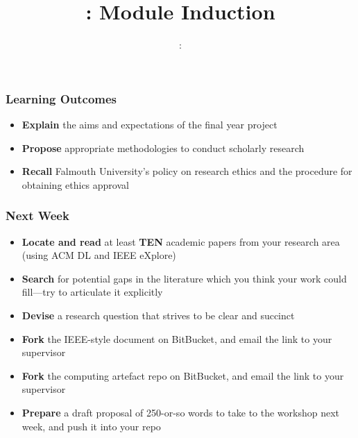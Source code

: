 \usepackage{../../beamerthemeFalmouthGamesAcademy}
\usepackage{multimedia}
\graphicspath{ {../../} }


\usepackage[normalem]{ulem}
\usepackage{wasysym}

\usepackage{algpseudocode}

\usepackage{pdfpages}

\usepackage{fancyvrb}

\usetikzlibrary{arrows,automata}





\title{\sessionnumber: Module Induction}
\subtitle{\modulecode: \moduletitle}

\frame{\titlepage} 

\begin{frame}
	\frametitle{Learning Outcomes}
	\begin{itemize}
		\item \textbf{Explain} the aims and expectations of the final year project
		\item \textbf{Propose} appropriate methodologies to conduct scholarly research
		\item \textbf{Recall} Falmouth University's policy on research ethics and the procedure for obtaining ethics approval
	\end{itemize}
\end{frame}





\begin{frame}
	\frametitle{Next Week}
	\begin{itemize}
		\item \textbf{Locate and read} at least \textbf{TEN} academic papers from your research area (using ACM DL and IEEE eXplore)
		\item \textbf{Search} for potential gaps in the literature which you think your work could fill---try to articulate it explicitly
		\item \textbf{Devise} a research question that strives to be clear and succinct
		\item \textbf{Fork} the IEEE-style document on BitBucket, and email the link to your supervisor
		\item \textbf{Fork} the computing artefact repo on BitBucket, and email the link to your supervisor
		\item \textbf{Prepare} a draft proposal of 250-or-so words to take to the workshop next week, and push it into your repo	
	\end{itemize}
\end{frame}


